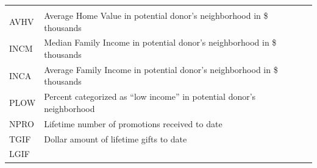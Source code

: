 \documentclass[]{article}
\begin{document}
\begin{longtable}[]{@{}ll@{}}
\begin{minipage}[t]{0.74\columnwidth}
\end{minipage}\tabularnewline
\begin{minipage}[t]{0.20\columnwidth}\raggedright\strut
AVHV\strut
\end{minipage} & \begin{minipage}[t]{0.74\columnwidth}\raggedright\strut
Average Home Value in potential donor's neighborhood in \$
thousands\strut
\end{minipage}\tabularnewline
\begin{minipage}[t]{0.20\columnwidth}\raggedright\strut
INCM\strut
\end{minipage} & \begin{minipage}[t]{0.74\columnwidth}\raggedright\strut
Median Family Income in potential donor's neighborhood in \$
thousands\strut
\end{minipage}\tabularnewline
\begin{minipage}[t]{0.20\columnwidth}\raggedright\strut
INCA\strut
\end{minipage} & \begin{minipage}[t]{0.74\columnwidth}\raggedright\strut
Average Family Income in potential donor's neighborhood in \$
thousands\strut
\end{minipage}\tabularnewline
\begin{minipage}[t]{0.20\columnwidth}\raggedright\strut
PLOW\strut
\end{minipage} & \begin{minipage}[t]{0.74\columnwidth}\raggedright\strut
Percent categorized as ``low income'' in potential donor's
neighborhood\strut
\end{minipage}\tabularnewline
\begin{minipage}[t]{0.20\columnwidth}\raggedright\strut
NPRO\strut
\end{minipage} & \begin{minipage}[t]{0.74\columnwidth}\raggedright\strut
Lifetime number of promotions received to date\strut
\end{minipage}\tabularnewline
\begin{minipage}[t]{0.20\columnwidth}\raggedright\strut
TGIF\strut
\end{minipage} & \begin{minipage}[t]{0.74\columnwidth}\raggedright\strut
Dollar amount of lifetime gifts to date\strut
\end{minipage}\tabularnewline
\begin{minipage}[t]{0.20\columnwidth}\raggedright\strut
LGIF\strut
\end{minipage} & \begin{minipage}[t]{0.74\columnwidth}\raggedright\strut

\end{minipage}
\end{longtable}
\end{document}
